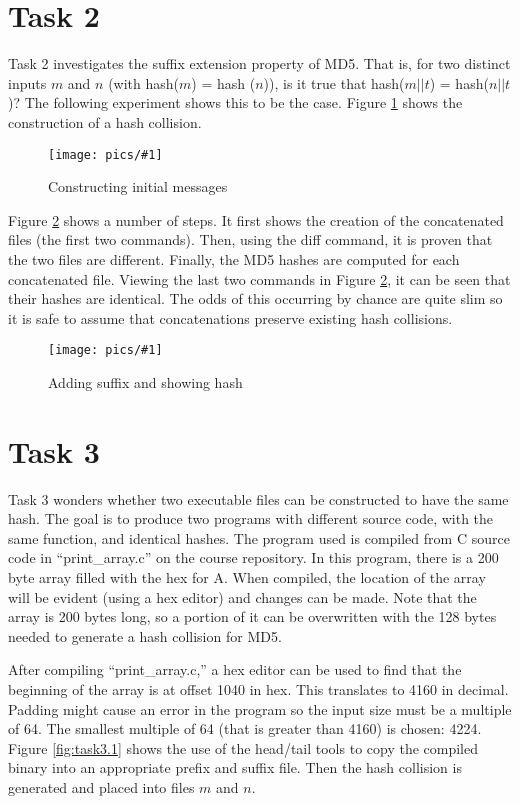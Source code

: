 \documentclass[11pt]{article}
\newcommand{\fig}[2]{ 
\begin{figure}[h]
	\centering
	\caption{#2}
	\texttt{[image: pics/\#1]}
	\label{fig:#1}
\end{figure} 
}
\begin{document}
\newpage
\section*{Task 2}

Task 2 investigates the suffix extension property of MD5. That is, for two distinct inputs $m$ and $n$ (with hash($m$) = hash ($n$)), is it true that hash($m || t$) = hash($n || t$)? The following experiment shows this to be the case. Figure \ref{fig:task2.1} shows the construction of a hash collision.

\fig{task2.1}{Constructing initial messages}

Figure \ref{fig:task2.2} shows a number of steps. It first shows the creation of the concatenated files (the first two commands). Then, using the diff command, it is proven that the two files are different. Finally, the MD5 hashes are computed for each concatenated file. Viewing the last two commands in Figure \ref{fig:task2.2}, it can be seen that their hashes are identical. The odds of this occurring by chance are quite slim so it is safe to assume that concatenations preserve existing hash collisions.

\fig{task2.2}{Adding suffix and showing hash}

\newpage
\section*{Task 3}

Task 3 wonders whether two executable files can be constructed to have the same hash. The goal is to produce two programs with different source code, with the same function, and identical hashes. The program used is compiled from C source code in ``print\_array.c'' on the course repository. In this program, there is a 200 byte array filled with the hex for A. When compiled, the location of the array will be evident (using a hex editor) and changes can be made. Note that the array is 200 bytes long, so a portion of it can be overwritten with the 128 bytes needed to generate a hash collision for MD5.

After compiling ``print\_array.c,'' a hex editor can be used to find that the beginning of the array is at offset 1040 in hex. This translates to 4160 in decimal. Padding might cause an error in the program so the input size must be a multiple of 64. The smallest multiple of 64 (that is greater than 4160) is chosen: 4224. Figure \ref{fig:task3.1} shows the use of the head/tail tools to copy the compiled binary into an appropriate prefix and suffix file. Then the hash collision is generated and placed into files $m$ and $n$.
\end{document}
